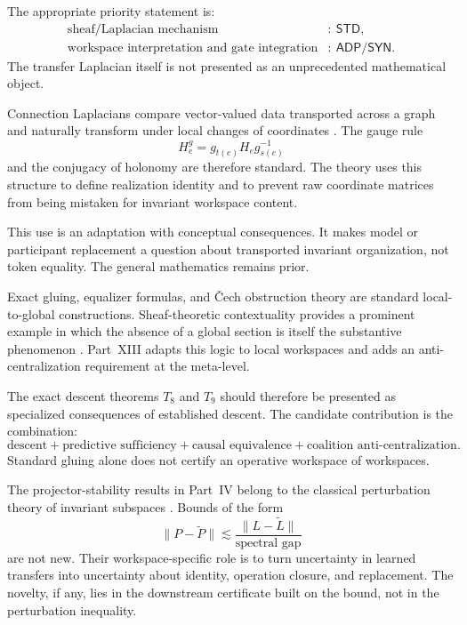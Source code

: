 The appropriate priority statement is:
\[
\begin{aligned}
\text{sheaf/Laplacian mechanism} &:\ \mathsf{STD},\\
\text{workspace interpretation and gate integration} &:\ \mathsf{ADP}/\mathsf{SYN}.
\end{aligned}
\]
The transfer Laplacian itself is not presented as an
unprecedented mathematical object.


Connection Laplacians compare vector-valued data transported across a graph
and naturally transform under local changes of coordinates
\cite{SingerWu2012}. The gauge rule
\[
H_e^g=g_{t(e)}H_eg_{s(e)}^{-1}
\]
and the conjugacy of holonomy are therefore standard. The theory uses
this structure to define realization identity and to prevent raw coordinate
matrices from being mistaken for invariant workspace content.

This use is an adaptation with conceptual consequences. It makes model or
participant replacement a question about transported invariant organization,
not token equality. The general mathematics remains prior.


Exact gluing, equalizer formulas, and \v{C}ech obstruction theory are standard
local-to-global constructions. Sheaf-theoretic contextuality provides a
prominent example in which the absence of a global section is itself the
substantive phenomenon \cite{AbramskyBrandenburger2011}. Part~XIII adapts this
logic to local workspaces and adds an anti-centralization requirement at the
meta-level.

The exact descent theorems \(T_8\) and \(T_9\) should therefore be presented as
specialized consequences of established descent. The candidate contribution
is the combination:
\[
\text{descent}
+
\text{predictive sufficiency}
+
\text{causal equivalence}
+
\text{coalition anti-centralization}.
\]
Standard gluing alone does not certify an operative workspace of workspaces.


The projector-stability results in Part~IV belong to the classical perturbation
theory of invariant subspaces \cite{DavisKahan1970,Kato1995}. Bounds of the
form
\[
\|P-\widetilde P\|
\lesssim
\frac{\|L-\widetilde L\|}{\text{spectral gap}}
\]
are not new. Their workspace-specific role is to turn uncertainty in learned
transfers into uncertainty about identity, operation closure, and replacement.
The novelty, if any, lies in the downstream certificate built on the bound, not
in the perturbation inequality.

